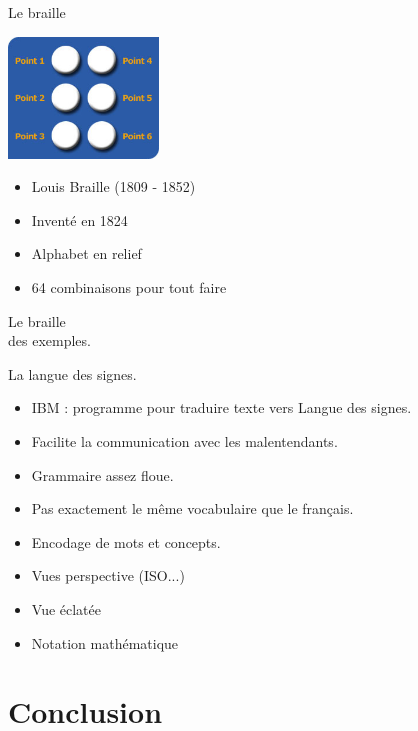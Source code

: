 \documentclass{beamer}
\begin{document}
\begin{frame}  
  \Huge{Le braille}
  \begin{center}
  \includegraphics[width=4cm]{./include/cellule_braille.jpg}
  \end{center}
  \normalsize \begin{itemize}
  \item Louis Braille (1809 - 1852)
  \item Inventé en 1824
  \item Alphabet en relief
  \item 64 combinaisons pour tout faire
  \end{itemize}
\end{frame}

\begin{frame}  
  \Huge Le braille
  \\ des exemples.
\end{frame}


\begin{frame}  
  { \Huge La langue des signes. }
  \begin{itemize}
  \item IBM : programme pour traduire texte vers Langue des signes.
  \item Facilite la communication avec les malentendants.
  \item Grammaire assez floue.
  \item Pas exactement le même vocabulaire que le français.
  \item Encodage de mots et concepts.
  \end{itemize}
\end{frame}

\begin{frame}  
  \begin{itemize}
  \item Vues perspective (ISO...) %
  \item Vue éclatée
  \item Notation mathématique
  \end{itemize}
\end{frame}

\section{Conclusion}


\begin{frame}
\end{frame}
\end{document}
